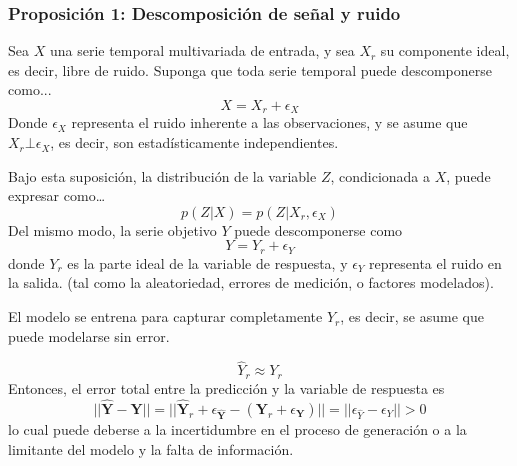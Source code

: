 \documentclass[12pt,letterpaper]{article}
\begin{document}
\subsubsection{Proposición 1: Descomposición de señal y ruido}
Sea $X$ una serie temporal multivariada de entrada, y sea $X_r$ su componente ideal, es decir, libre de ruido. Suponga que toda serie temporal puede descomponerse como...
\begin{equation}
    X = X_r + \epsilon_X
\end{equation}
Donde $\epsilon_X$ representa el ruido inherente a las observaciones, y se asume que $X_r \bot \epsilon_X$, es decir, son estadísticamente independientes.

Bajo esta suposición, la distribución de la variable $Z$, condicionada a $X$, puede expresar como\dots
\begin{equation}
    p(Z|X)=p(Z|X_r, \epsilon_X)
\end{equation}
Del mismo modo, la serie objetivo $Y$ puede descomponerse como 
\begin{equation}
    Y = Y_r + \epsilon_Y
\end{equation}
donde $Y_r$ es la parte ideal de la variable de respuesta, y $\epsilon_Y$ representa el ruido en la salida. (tal como la aleatoriedad, errores de medición, o factores modelados).

El modelo se entrena para capturar completamente $Y_r$, es decir, se asume que puede modelarse sin error.

\begin{equation}
    \hat{Y}_r\approx Y_r
\end{equation}
Entonces, el error total entre la predicción y la variable de respuesta es
\begin{equation}
    ||\hat{\textbf{Y}}  -\textbf{Y}||=||\hat{\textbf{Y}}_r + \epsilon_{\hat{\textbf{Y}}} -( \textbf{Y}_r +\epsilon_\textbf{Y})||=||\epsilon_{\hat{Y}} - \epsilon_{Y}||>0
\end{equation}
lo cual puede deberse a la incertidumbre en el proceso de generación o a la limitante del modelo y la falta de información.
\end{document}
